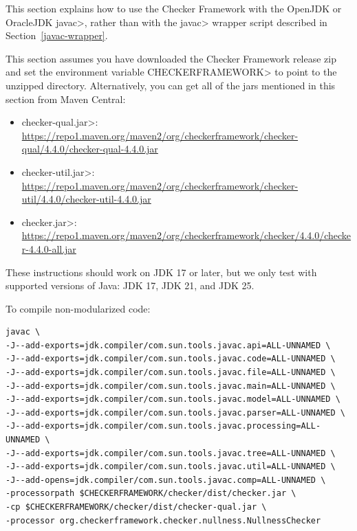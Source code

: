 
This section explains how to use the Checker Framework with the OpenJDK or
OracleJDK \<javac>, rather than with the \<javac> wrapper script described in
Section~\ref{javac-wrapper}.

This
section assumes you have downloaded the Checker Framework release zip and set
the environment variable \<CHECKERFRAMEWORK> to point to the unzipped directory.
Alternatively, you can get all of the jars mentioned in this section from Maven Central:

\begin{itemize}
\item \<checker-qual.jar>: \url{https://repo1.maven.org/maven2/org/checkerframework/checker-qual/4.4.0/checker-qual-4.4.0.jar}
\item \<checker-util.jar>: \url{https://repo1.maven.org/maven2/org/checkerframework/checker-util/4.4.0/checker-util-4.4.0.jar}
\item \<checker.jar>: \url{https://repo1.maven.org/maven2/org/checkerframework/checker/4.4.0/checker-4.4.0-all.jar}
\end{itemize}

These instructions should work on JDK 17 or later, but we only test with supported
versions of Java: JDK 17, JDK 21, and JDK 25.



To compile non-modularized code:

\begin{Verbatim}
javac \
-J--add-exports=jdk.compiler/com.sun.tools.javac.api=ALL-UNNAMED \
-J--add-exports=jdk.compiler/com.sun.tools.javac.code=ALL-UNNAMED \
-J--add-exports=jdk.compiler/com.sun.tools.javac.file=ALL-UNNAMED \
-J--add-exports=jdk.compiler/com.sun.tools.javac.main=ALL-UNNAMED \
-J--add-exports=jdk.compiler/com.sun.tools.javac.model=ALL-UNNAMED \
-J--add-exports=jdk.compiler/com.sun.tools.javac.parser=ALL-UNNAMED \
-J--add-exports=jdk.compiler/com.sun.tools.javac.processing=ALL-UNNAMED \
-J--add-exports=jdk.compiler/com.sun.tools.javac.tree=ALL-UNNAMED \
-J--add-exports=jdk.compiler/com.sun.tools.javac.util=ALL-UNNAMED \
-J--add-opens=jdk.compiler/com.sun.tools.javac.comp=ALL-UNNAMED \
-processorpath $CHECKERFRAMEWORK/checker/dist/checker.jar \
-cp $CHECKERFRAMEWORK/checker/dist/checker-qual.jar \
-processor org.checkerframework.checker.nullness.NullnessChecker
\end{Verbatim}

